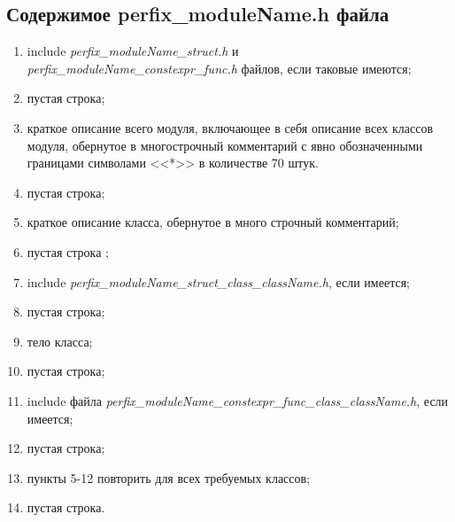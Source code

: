 \subsection{Содержимое perfix\_moduleName.h файла}\label{p:modul:h}
\begin{enumerate}
	\item include \textit{perfix\_moduleName\_struct.h} и \textit{perfix\_moduleName\_constexpr\_func.h}  файлов, если таковые имеются;
	\item пустая строка;
	\item краткое описание всего модуля, включающее в себя описание всех классов модуля, обернутое в многострочный комментарий с явно обозначенными границами символами <<*>> в количестве 70 штук.
	\item пустая строка;
	\item краткое описание класса, обернутое в много строчный комментарий;
	\item пустая строка ;
	\item include \textit{perfix\_moduleName\_struct\_class\_className.h}, если имеется;
	\item пустая строка;
	\item тело класса;
	\item пустая строка;
	\item include файла \textit{perfix\-\_moduleName\-\_constexpr\-\_func\-\_class\-\_className.h}, если имеется;
	\item пустая строка;
	\item пункты 5-12 повторить для всех требуемых классов;
	\item пустая строка.
\end{enumerate}
